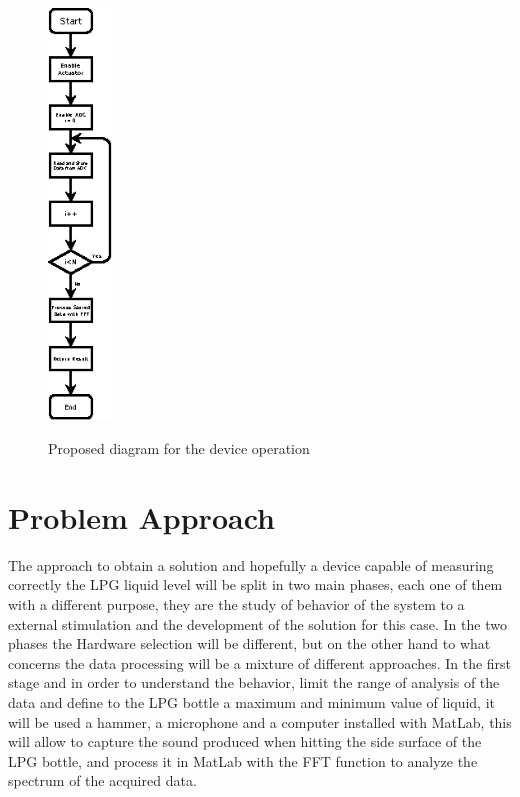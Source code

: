 \begin{figure}[]
    \centering
    \includegraphics[width=0.15\textwidth]{Chapters/3CHP/Images/fluxogramArchProp.eps}
    \caption{Proposed diagram for the device operation}{}
    \label{fig:systemSWFlow}
\end{figure}

\section{Problem Approach}
The approach to obtain a solution and hopefully a device capable of measuring correctly the LPG liquid level will be split in two main phases, each one of them with a different purpose, they are the study of behavior of the system to a external stimulation and the development of the solution for this case. In the two phases the Hardware selection will be different, but on the other hand to what concerns the data processing will be a mixture of different approaches.
In the first stage and in order to understand the behavior, limit the range of analysis of the data and define to the LPG bottle a maximum and minimum value of liquid, it will be used a hammer, a microphone and a computer installed with MatLab, this will allow to capture the sound produced when hitting the side surface of the LPG bottle, and process it in MatLab with the FFT function to analyze the spectrum of the acquired data.

